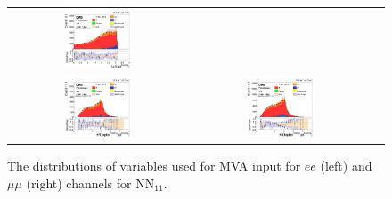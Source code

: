 \begin{figure}[ht]
\begin{center}
\begin{tabular}{ccc}
      \includegraphics[width=0.4\textwidth]{figures/tW/fig/MVA_input/mumu/H_1j1b_dPhi_ll_j1.png}\\
      \includegraphics[width=0.4\textwidth]{figures/tW/fig/MVA_input/ee/H_1j1b_dR_l1_j1.png}&
      \includegraphics[width=0.4\textwidth]{figures/tW/fig/MVA_input/mumu/H_1j1b_dR_l1_j1.png}\\
    \end{tabular}
    \caption{The distributions of variables used for MVA input for $ee$ (left) and $\mu\mu$ (right) channels for NN$_{11}$.
    \label{fig:MVA_1j1t_1}}
  \end{center}
\end{figure}

